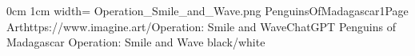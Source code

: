 \documentclass[letterpaper,openany,twoside,twocolumn]{book}
\begin{document}
	\DungeonSheetGeometry
		{0cm}%
		{1cm}%
		{width=\paperwidth}%
		{Operation_Smile_and_Wave.png}%
		{%
			{PenguinsOfMadagascar1}{Page \thepage}{Art}{https://www.imagine.art/}{Operation: Smile and Wave}{ChatGPT}%
		}%
		{Penguins of Madagascar}%
		{Operation: Smile and Wave}%
		{black/white}%
	\clearpage
	\tableofcontents
	
\end{document}
